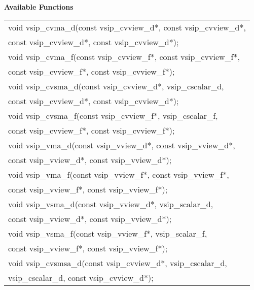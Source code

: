 \\\cvsiplh
\newline \hspace*{.8cm} \vspace*{.1cm} \textbf{Available Functions }
\newline \hspace*{1.1cm} {
\ttfamily
\begin{tabular}[H]{l}
void vsip\_cvma\_d(const vsip\_cvview\_d*, const vsip\_cvview\_d*,\\*\hspace{.7cm}const vsip\_cvview\_d*, const vsip\_cvview\_d*);\\
void vsip\_cvma\_f(const vsip\_cvview\_f*, const vsip\_cvview\_f*,\\*\hspace{.7cm}const vsip\_cvview\_f*, const vsip\_cvview\_f*);\\
void vsip\_cvsma\_d(const vsip\_cvview\_d*, vsip\_cscalar\_d,\\*\hspace{.7cm}const vsip\_cvview\_d*, const vsip\_cvview\_d*);\\
void vsip\_cvsma\_f(const vsip\_cvview\_f*, vsip\_cscalar\_f,\\*\hspace{.7cm}const vsip\_cvview\_f*, const vsip\_cvview\_f*);\\
void vsip\_vma\_d(const vsip\_vview\_d*, const vsip\_vview\_d*,\\*\hspace{.7cm}const vsip\_vview\_d*, const vsip\_vview\_d*);\\
void vsip\_vma\_f(const vsip\_vview\_f*, const vsip\_vview\_f*,\\*\hspace{.7cm}const vsip\_vview\_f*, const vsip\_vview\_f*);\\
void vsip\_vsma\_d(const vsip\_vview\_d*, vsip\_scalar\_d,\\*\hspace{.7cm}const vsip\_vview\_d*, const vsip\_vview\_d*);\\
void vsip\_vsma\_f(const vsip\_vview\_f*, vsip\_scalar\_f,\\*\hspace{.7cm}const vsip\_vview\_f*, const vsip\_vview\_f*);\\
void vsip\_cvsmsa\_d(const vsip\_cvview\_d*, vsip\_cscalar\_d,\\*\hspace{.7cm}vsip\_cscalar\_d, const vsip\_cvview\_d*);\\

\end{tabular}}
